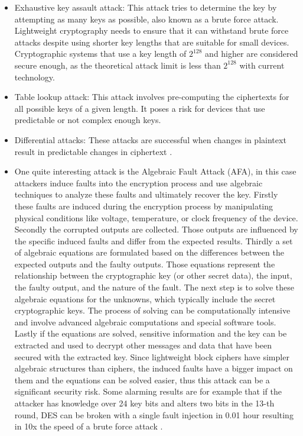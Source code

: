 \begin{itemize}
    \item Exhaustive key assault attack: This attack tries to determine the key by attempting as many keys as possible, also known as a brute force attack. Lightweight cryptography needs to ensure that it can withstand brute force attacks despite using shorter key lengths that are suitable for small devices. Cryptographic systems that use a key length of $2^{128}$ and higher are considered secure enough, as the theoretical attack limit is less than $2^{128}$ with current technology.
    \item Table lookup attack: This attack involves pre-computing the ciphertexts for all possible keys of a given length. It poses a risk for devices that use predictable or not complex enough keys.
    \item Differential attacks: These attacks are successful when changes in plaintext result in predictable changes in ciphertext \cite{ekwueme2024lightweight}.
    \item One quite interesting attack is the Algebraic Fault Attack (AFA), in this case attackers induce faults into the encryption process and use algebraic techniques to analyze these faults and ultimately recover the key. Firstly these faults are induced during the encryption process by manipulating physical conditions like voltage, temperature, or clock frequency of the device. Secondly the corrupted outputs are collected. Those outputs are influenced by the specific induced faults and differ from the expected results. Thirdly a set of algebraic equations are formulated based on the differences between the expected outputs and the faulty outputs. Those equations represent the relationship between the cryptographic key (or other secret data), the input, the faulty output, and the nature of the fault. The next step is to solve these algebraic equations for the unknowns, which typically include the secret cryptographic keys. The process of solving can be computationally intensive and involve advanced algebraic computations and special software tools. Lastly if the equations are solved, sensitive information and the key can be extracted and used to decrypt other messages and data that have been secured with the extracted key. Since lightweight block ciphers have simpler algebraic structures than ciphers, the induced faults have a bigger impact on them and the equations can be solved easier, thus this attack can be a significant security risk. Some alarming results are for example that if the attacker has knowledge over 24 key bits and alters two bits in the 13-th round, DES can be broken with a single fault injection in 0.01 hour resulting in 10x the speed of a brute force attack \cite{zhang2016framework}.

\end{itemize}
